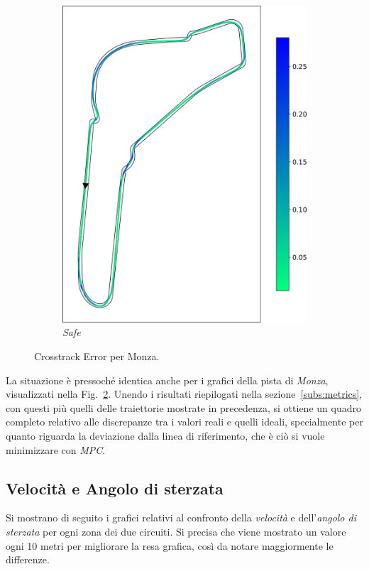 \begin{figure}[H]
\begin{subfigure}[b]{0.369\textwidth}
        \includegraphics[width=\textwidth]{images/monza_mpc_safe_crosstrack.png}
        \caption{\textit{Safe}}
        \label{fig:tracking_safe_monza}
    \end{subfigure}
    \caption{Crosstrack Error per Monza.}
    \label{fig:fig19} %
\end{figure}
La situazione è pressoché identica anche per i grafici della pista di 
\textit{Monza}, visualizzati nella Fig.~\ref{fig:fig19}. Unendo i 
risultati riepilogati nella sezione~\ref{subs:metrics}, con questi più 
quelli delle traiettorie mostrate in precedenza, si ottiene un quadro completo
relativo alle discrepanze tra i valori reali e quelli ideali, 
specialmente per quanto riguarda la deviazione dalla linea di riferimento, che è ciò si vuole minimizzare con \textit{MPC}.

\subsection{Velocità e Angolo di sterzata}
Si mostrano di seguito i grafici relativi al confronto della \textit{velocità} e 
dell'\textit{angolo di sterzata} per ogni zona dei due circuiti. Si precisa che viene mostrato
un valore ogni 10 metri per migliorare la resa grafica, così da notare maggiormente le differenze.

